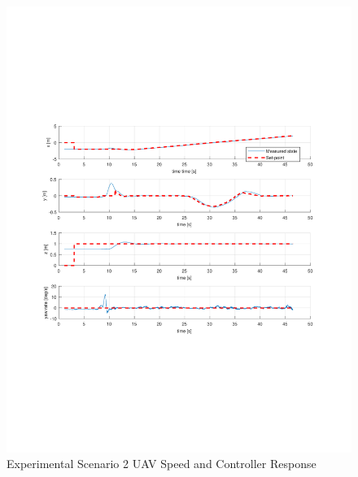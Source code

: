\documentclass[numbered,pdftex]{ohio-etd}
\begin{document}
\begin{figure}[H]
	\centering
	\includegraphics[trim = 65 210 0 200, clip, width=16cm]{Figures/results/compareFigures/2Controller}
	\caption{Experimental Scenario 2 UAV Speed and Controller Response}
	\label{fig:2Controller}
\end{figure}
\end{document}
